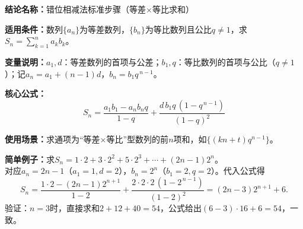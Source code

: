 \textbf{结论名称：}错位相减法标准步骤（等差$\times$等比求和）

\textbf{适用条件：}数列$\{a_n\}$为等差数列，$\{b_n\}$为等比数列且公比$q\neq 1$，求$S_n=\sum_{k=1}^{n} a_k b_k$。

\textbf{变量说明：}$a_1,d$：等差数列的首项与公差；$b_1,q$：等比数列的首项与公比（$q\neq 1$）；记$a_n=a_1+(n-1)d$，$b_n=b_1 q^{\,n-1}$。

\textbf{核心公式：}
\[
\boxed{ S_n = \frac{a_1 b_1 - a_n b_n q}{1-q} + \frac{d\,b_1 q\,(1-q^{\,n-1})}{(1-q)^2} }
\]

\textbf{使用场景：}求通项为“等差$\times$等比”型数列的前$n$项和，如$\{(kn+t)q^{n-1}\}$。

\textbf{简单例子：}求$S_n = 1\cdot 2 + 3\cdot 2^2 + 5\cdot 2^3 + \cdots + (2n-1)2^n$。\\
对应$a_n=2n-1$（$a_1=1,d=2$），$b_n=2^n$（$b_1=2,q=2$）。代入公式得
\[
S_n = \frac{1\cdot 2 - (2n-1)2^{n+1}}{1-2} + \frac{2\cdot 2\cdot 2\,(1-2^{\,n-1})}{(1-2)^2}
     = (2n-3)2^{n+1}+6 .
\]
验证：$n=3$时，直接求和$2+12+40=54$，公式给出$(6-3)\cdot 16+6=54$，一致。